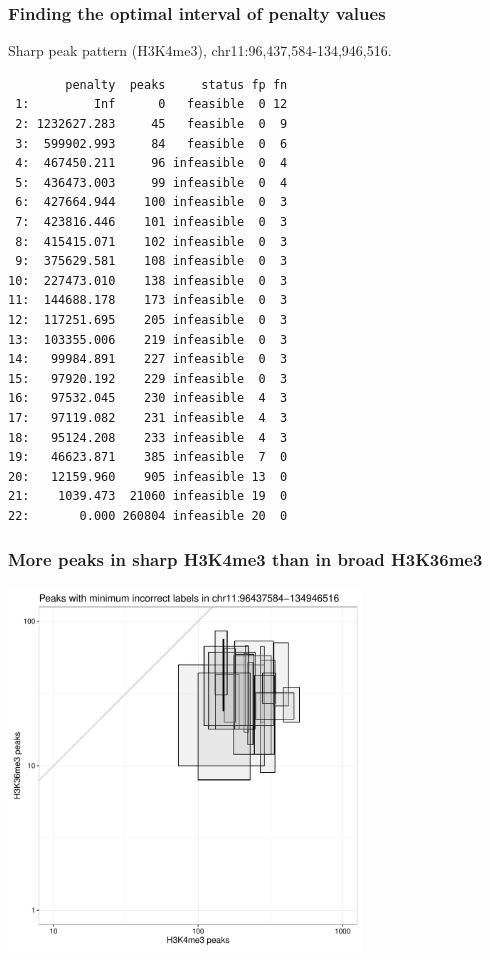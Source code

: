 \documentclass{beamer}
\begin{document}
\begin{frame}[fragile]
  \frametitle{Finding the optimal interval of penalty values}
\vskip 0.2cm Sharp peak pattern (H3K4me3), chr11:96,437,584-134,946,516.
\scriptsize
\begin{verbatim}
        penalty  peaks     status fp fn
 1:         Inf      0   feasible  0 12
 2: 1232627.283     45   feasible  0  9
 3:  599902.993     84   feasible  0  6
 4:  467450.211     96 infeasible  0  4
 5:  436473.003     99 infeasible  0  4
 6:  427664.944    100 infeasible  0  3
 7:  423816.446    101 infeasible  0  3
 8:  415415.071    102 infeasible  0  3
 9:  375629.581    108 infeasible  0  3
10:  227473.010    138 infeasible  0  3
11:  144688.178    173 infeasible  0  3
12:  117251.695    205 infeasible  0  3
13:  103355.006    219 infeasible  0  3
14:   99984.891    227 infeasible  0  3
15:   97920.192    229 infeasible  0  3
16:   97532.045    230 infeasible  4  3
17:   97119.082    231 infeasible  4  3
18:   95124.208    233 infeasible  4  3
19:   46623.871    385 infeasible  7  0
20:   12159.960    905 infeasible 13  0
21:    1039.473  21060 infeasible 19  0
22:       0.000 260804 infeasible 20  0
\end{verbatim}
\end{frame}

\begin{frame}
  \frametitle{More peaks in sharp H3K4me3 than in broad H3K36me3}
  \includegraphics[width=0.7\textwidth]{figure-min-err-peaks-compare}
\end{frame}
\end{document}

